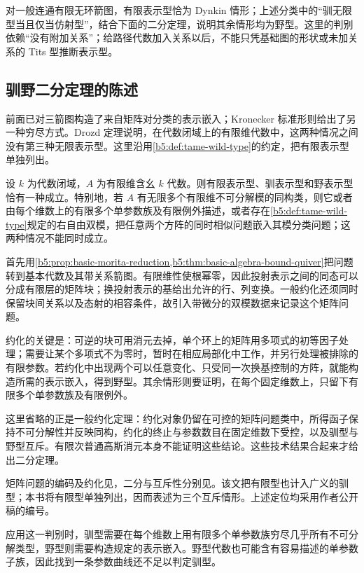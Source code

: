 \ProseParagraphBreak
对一般连通有限无环箭图，有限表示型恰为 Dynkin 情形；上述分类中的“驯无限型当且仅当仿射型”，结合下面的二分定理，说明其余情形均为野型。这里的判别依赖“没有附加关系”；给路径代数加入关系以后，不能只凭基础图的形状或未加关系的 Tits 型推断表示型。

\subsection{驯野二分定理的陈述}
\label{b5:subsec:1007:04}

前面已对三箭图构造了来自矩阵对分类的表示嵌入；Kronecker 标准形则给出了另一种穷尽方式。Drozd 定理说明，在代数闭域上的有限维代数中，这两种情况之间没有第三种无限表示型。这里沿用\cref{b5:def:tame-wild-type}的约定，把有限表示型单独列出。

\begin{theorem}\label{b5:thm:drozd-dichotomy}
	设 \(k\) 为代数闭域，\(A\) 为有限维含幺 \(k\) 代数。则有限表示型、驯表示型和野表示型恰有一种成立。特别地，若 \(A\) 有无限多个有限维不可分解模的同构类，则它或者由每个维数上的有限多个单参数族及有限例外描述，或者存在\cref{b5:def:tame-wild-type}规定的右自由双模，把任意两个方阵的同时相似问题嵌入其模分类问题；这两种情况不能同时成立。
\end{theorem}
\begin{proofsketch}
	首先用\cref{b5:prop:basic-morita-reduction,b5:thm:basic-algebra-bound-quiver}把问题转到基本代数及其带关系箭图。有限维性使根幂零，因此投射表示之间的同态可以分成有限层的矩阵块；换投射表示的基给出允许的行、列变换。一般约化还须同时保留块间关系以及态射的相容条件，故引入带微分的双模数据来记录这个矩阵问题。

	约化的关键是：可逆的块可用消元去掉，单个环上的矩阵用多项式的初等因子处理；需要让某个多项式不为零时，暂时在相应局部化中工作，并另行处理被排除的有限参数。若约化中出现两个可以任意变化、只受同一次换基控制的方阵，就能构造所需的表示嵌入，得到野型。其余情形则要证明，在每个固定维数上，只留下有限多个单参数族及有限例外。

	这里省略的正是一般约化定理：约化对象仍留在可控的矩阵问题类中，所得函子保持不可分解性并反映同构，约化的终止与参数数目在固定维数下受控，以及驯型与野型互斥。有限次普通高斯消元本身不能证明这些结论。这些技术结果合起来才给出二分定理。
\end{proofsketch}
矩阵问题的编码及约化见\cite[作者公开稿, Sections 4--6]{Drozd2001Reduction}，二分与互斥性分别见\cite[作者公开稿, Theorem 8.1, Corollary 8.3 and Proposition 5.5]{Drozd2001Reduction}。该文把有限型也计入广义的驯型；本书将有限型单独列出，因而表述为三个互斥情形。上述定位均采用作者公开稿的编号。

\ProseParagraphBreak
应用这一判别时，驯型需要在每个维数上用有限多个单参数族穷尽几乎所有不可分解类型，野型则需要构造规定的表示嵌入。野型代数也可能含有容易描述的单参数子族，因此找到一条参数曲线还不足以判定驯型。
